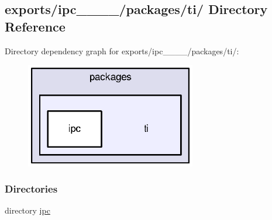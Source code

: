 \subsection{exports/ipc\-\_\-\_\-\_\-\_/packages/ti/ Directory Reference}
\label{dir_c0dbe21f1895d63799b1abdb14544051}
Directory dependency graph for exports/ipc\-\_\-\_\-\_\-\_/packages/ti/\-:
\nopagebreak
\begin{figure}[H]
\begin{center}
\leavevmode
\includegraphics[width=211pt]{dir_c0dbe21f1895d63799b1abdb14544051_dep}
\end{center}
\end{figure}
\subsubsection*{Directories}
\begin{DoxyCompactItemize}
\item 
directory \hyperlink{dir_d79a042dad10b03eb0064292f0e1fe58}{ipc}
\end{DoxyCompactItemize}
